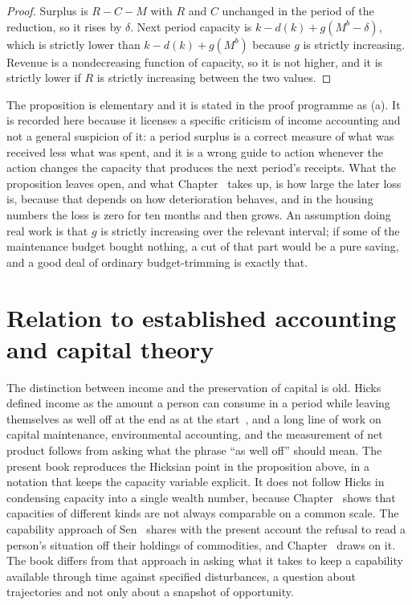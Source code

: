 \begin{proof}
Surplus is $R-C-M$ with $R$ and $C$ unchanged in the period of the reduction, so it rises by $\delta$. Next period capacity is $k-d(k)+g(M^b-\delta)$, which is strictly lower than $k-d(k)+g(M^b)$ because $g$ is strictly increasing. Revenue is a nondecreasing function of capacity, so it is not higher, and it is strictly lower if $R$ is strictly increasing between the two values.
\end{proof}

The proposition is elementary and it is stated in the proof programme as (a). It is recorded here because it licenses a specific criticism of income accounting and not a general suspicion of it: a period surplus is a correct measure of what was received less what was spent, and it is a wrong guide to action whenever the action changes the capacity that produces the next period's receipts. What the proposition leaves open, and what Chapter~ takes up, is how large the later loss is, because that depends on how deterioration behaves, and in the housing numbers the loss is zero for ten months and then grows. An assumption doing real work is that $g$ is strictly increasing over the relevant interval; if some of the maintenance budget bought nothing, a cut of that part would be a pure saving, and a good deal of ordinary budget-trimming is exactly that.

\section{Relation to established accounting and capital theory}

The distinction between income and the preservation of capital is old. Hicks defined income as the amount a person can consume in a period while leaving themselves as well off at the end as at the start~\cite{hicks1939}, and a long line of work on capital maintenance, environmental accounting, and the measurement of net product follows from asking what the phrase ``as well off'' should mean. The present book reproduces the Hicksian point in the proposition above, in a notation that keeps the capacity variable explicit. It does not follow Hicks in condensing capacity into a single wealth number, because Chapter~ shows that capacities of different kinds are not always comparable on a common scale. The capability approach of Sen~\cite{sen1985} shares with the present account the refusal to read a person's situation off their holdings of commodities, and Chapter~ draws on it. The book differs from that approach in asking what it takes to keep a capability available through time against specified disturbances, a question about trajectories and not only about a snapshot of opportunity.

